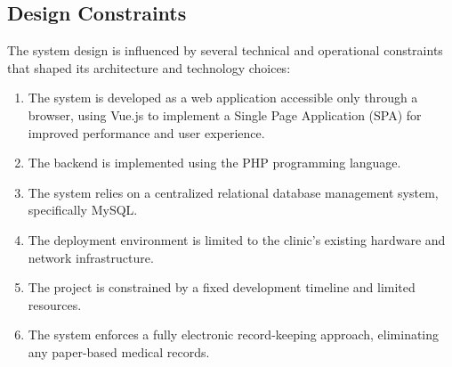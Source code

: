 \subsection{Design Constraints}

The system design is influenced by several technical and operational constraints that shaped its architecture and technology choices:

\begin{enumerate}
	\item The system is developed as a web application accessible only through a browser, using Vue.js to implement a Single Page Application (SPA) for improved performance and user experience.
	\item The backend is implemented using the PHP programming language.
	\item The system relies on a centralized relational database management system, specifically MySQL.
	\item The deployment environment is limited to the clinic's existing hardware and network infrastructure.
	\item The project is constrained by a fixed development timeline and limited resources.
	\item The system enforces a fully electronic record-keeping approach, eliminating any paper-based medical records.
\end{enumerate}